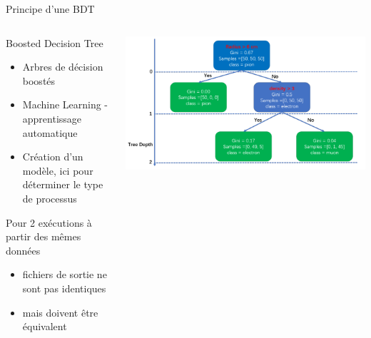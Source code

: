 \documentclass[9pt]{beamer}
\begin{document}

\begin{frame}{Principe d'une BDT}

    \begin{columns}
    
        \begin{column}{0.5\textwidth}
            \begin{block}{Boosted Decision Tree}
                \begin{itemize}
                    \item Arbres de décision boostés
                    \item Machine Learning - apprentissage automatique
                    \item Création d'un modèle, ici pour déterminer le type de processus 
                    
                \end{itemize}
            \end{block}
            \begin{alertblock}{Pour 2 exécutions à partir des mêmes données}
                \begin{itemize}
                    \item fichiers de sortie ne sont pas identiques 
                    \item mais doivent être équivalent
                \end{itemize}
            \end{alertblock}
        \end{column}
        
        \begin{column}{0.5\textwidth}
            \includegraphics[width=\textwidth]{../img/ExampleBDT.png}
        \end{column}
        
    \end{columns}

\end{frame}
\end{document}
